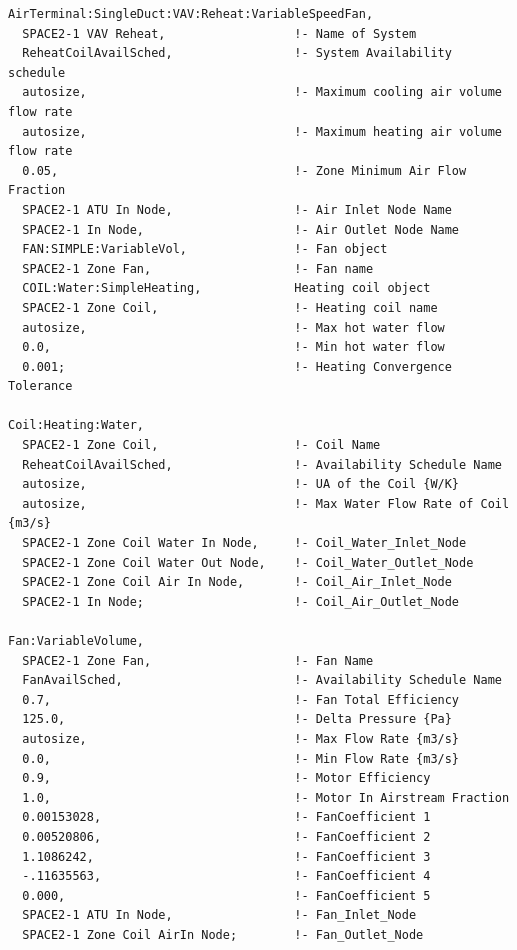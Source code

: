 \begin{lstlisting}
AirTerminal:SingleDuct:VAV:Reheat:VariableSpeedFan,
  SPACE2-1 VAV Reheat,                  !- Name of System
  ReheatCoilAvailSched,                 !- System Availability schedule
  autosize,                             !- Maximum cooling air volume flow rate
  autosize,                             !- Maximum heating air volume flow rate
  0.05,                                 !- Zone Minimum Air Flow Fraction
  SPACE2-1 ATU In Node,                 !- Air Inlet Node Name
  SPACE2-1 In Node,                     !- Air Outlet Node Name
  FAN:SIMPLE:VariableVol,               !- Fan object
  SPACE2-1 Zone Fan,                    !- Fan name
  COIL:Water:SimpleHeating,             Heating coil object
  SPACE2-1 Zone Coil,                   !- Heating coil name
  autosize,                             !- Max hot water flow
  0.0,                                  !- Min hot water flow
  0.001;                                !- Heating Convergence Tolerance

Coil:Heating:Water,
  SPACE2-1 Zone Coil,                   !- Coil Name
  ReheatCoilAvailSched,                 !- Availability Schedule Name
  autosize,                             !- UA of the Coil {W/K}
  autosize,                             !- Max Water Flow Rate of Coil {m3/s}
  SPACE2-1 Zone Coil Water In Node,     !- Coil_Water_Inlet_Node
  SPACE2-1 Zone Coil Water Out Node,    !- Coil_Water_Outlet_Node
  SPACE2-1 Zone Coil Air In Node,       !- Coil_Air_Inlet_Node
  SPACE2-1 In Node;                     !- Coil_Air_Outlet_Node

Fan:VariableVolume,
  SPACE2-1 Zone Fan,                    !- Fan Name
  FanAvailSched,                        !- Availability Schedule Name
  0.7,                                  !- Fan Total Efficiency
  125.0,                                !- Delta Pressure {Pa}
  autosize,                             !- Max Flow Rate {m3/s}
  0.0,                                  !- Min Flow Rate {m3/s}
  0.9,                                  !- Motor Efficiency
  1.0,                                  !- Motor In Airstream Fraction
  0.00153028,                           !- FanCoefficient 1
  0.00520806,                           !- FanCoefficient 2
  1.1086242,                            !- FanCoefficient 3
  -.11635563,                           !- FanCoefficient 4
  0.000,                                !- FanCoefficient 5
  SPACE2-1 ATU In Node,                 !- Fan_Inlet_Node
  SPACE2-1 Zone Coil AirIn Node;        !- Fan_Outlet_Node
\end{lstlisting}

